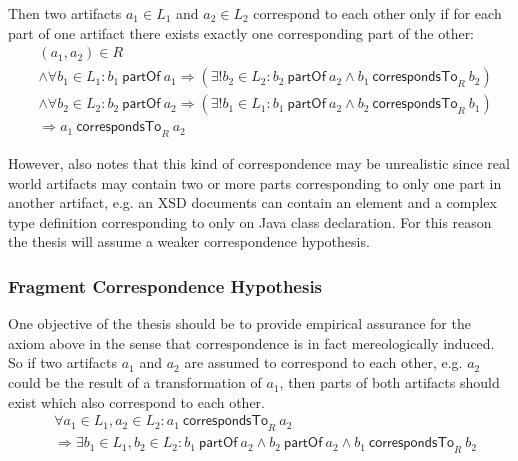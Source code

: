 \documentclass[runningheads,a4paper]{llncs}
\newcommand{\partOf}{~\textsf{partOf}~}
\newcommand{\correspondsToR}[1]{~\textsf{correspondsTo}_{#1}~}
\begin{document}
Then two artifacts $a_1 \in L_1$ and $a_2 \in L_2$ correspond to each other only if for each part of one artifact there exists exactly one corresponding part of the other:
\begin{align*}
&(a_1,a_2) \in R
\\&\wedge \forall b_1 \in L_1 : b_1 \partOf a_1 \Rightarrow (\exists! b_2 \in L_2 : b_2 \partOf a_2 \wedge b_1 \correspondsToR{R} b_2 )
\\&\wedge \forall b_2 \in L_2 : b_2 \partOf a_2 \Rightarrow (\exists! b_1 \in L_1 : b_1 \partOf a_2 \wedge b_2 \correspondsToR{R} b_1 )
\\&\Rightarrow a_1 \correspondsToR{R} a_2
\end{align*}

However, \cite{DBLP:conf/sle/Lammel16} also notes that this kind of correspondence may be unrealistic since real world artifacts may contain two or more parts corresponding to only one part in another artifact, e.g. an XSD documents can contain an element and a complex type definition corresponding to only on Java class declaration.
For this reason the thesis will assume a weaker correspondence hypothesis.

\subsubsection{Fragment Correspondence Hypothesis}
One objective of the thesis should be to provide empirical assurance for the axiom above in the sense that correspondence is in fact mereologically induced.
So if two artifacts $a_1$ and $a_2$ are assumed to correspond to each other, e.g. $a_2$ could be the result of a transformation of $a_1$, then parts of both artifacts should exist which also correspond to each other.
\begin{align*}
&\forall a_1 \in L_1, a_2 \in L_2 : 
a_1 \correspondsToR{R} a_2
\\&\Rightarrow 
\exists b_1 \in L_1, b_2 \in L_2 : 
b_1 \partOf a_2 \wedge b_2 \partOf a_2 \wedge b_1 \correspondsToR{R} b_2
\end{align*}
\end{document}
